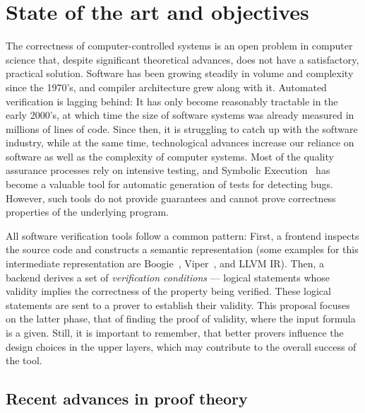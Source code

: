 \section{State of the art and objectives}

The correctness of computer-controlled systems is an open problem in computer science that, despite significant theoretical advances, does not have a satisfactory, practical solution.
Software has been growing steadily in volume and complexity since the 1970's, and compiler architecture grew along with it.
Automated verification is lagging behind: It has only become reasonably tractable in the early 2000's, at which time the size of software systems was already measured in millions of lines of code.
Since then, it is struggling to catch up with the software industry, while at the same time, technological advances increase our reliance on software as well as the complexity of computer systems.
Most of the quality assurance processes rely on intensive testing, and Symbolic Execution~\cite{symex30years} has become a valuable tool for automatic generation of tests for detecting bugs.
However, such tools do not provide guarantees and cannot prove correctness properties of the underlying program.

All software verification tools follow a common pattern:
First, a frontend inspects the source code and constructs a semantic representation (some examples for this intermediate representation are Boogie~\cite{boogie}, Viper~\cite{viper}, and LLVM IR).
Then, a backend derives a set of \emph{verification conditions} --- logical statements whose validity implies the correctness of the property being verified.
These logical statements are sent to a prover to establish their validity.
This proposal focuses on the latter phase, that of finding the proof of validity, where the input formula is a given.
Still, it is important to remember, that better provers influence the design choices in the upper layers, which may contribute to the overall success of the tool.

\subsection{Recent advances in proof theory}


